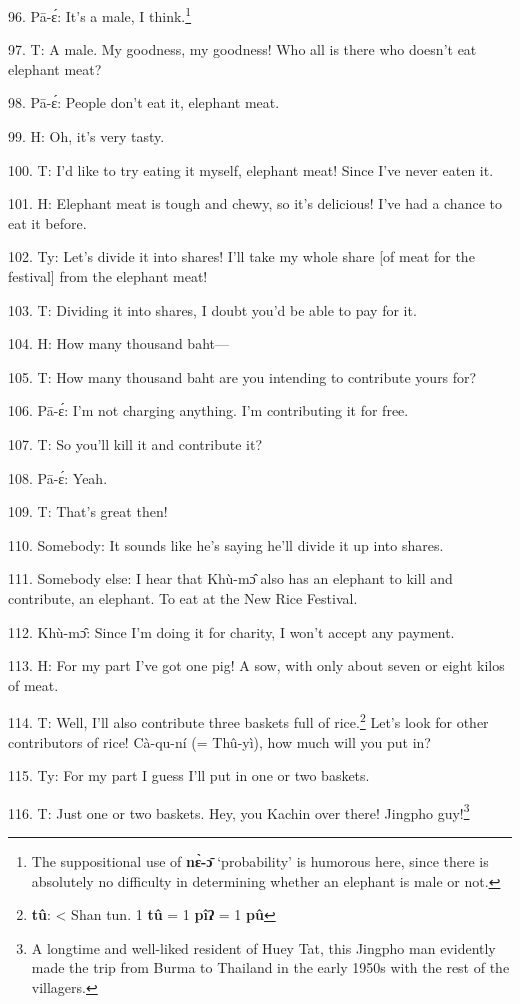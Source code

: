 96. Pā-ɛ́: It's a male, I think.\footnote{The suppositional use of \textbf{nɛ̀-ɔ̄} `probability' is humorous here, since there is absolutely no difficulty in determining whether an elephant is male or not.}

97. T: A male. My goodness, my goodness! Who all is there who doesn't eat elephant
meat?

98. Pā-ɛ́: People don't eat it, elephant meat.

99. H: Oh, it's very tasty.

100. T: I'd like to try eating it myself, elephant meat! Since I've never eaten
it.

101. H: Elephant meat is tough and chewy, so it's delicious! I've had a chance
to eat it before.

102. Ty: Let's divide it into shares! I'll take my whole share [of meat
for the festival] from the elephant meat!

103. T: Dividing it into shares, I doubt you'd be able to pay for it.

104. H: How many thousand baht---

105. T: How many thousand baht are you intending to contribute yours for?

106. Pā-ɛ́: I'm not charging anything. I'm contributing it for free.

107. T: So you'll kill it and contribute it?

108. Pā-ɛ́: Yeah.

109. T: That's great then!

110. Somebody: It sounds like he's saying he'll divide it up into shares.

111. Somebody else: I hear that Khù-mɔ̂ also has an elephant to kill and contribute,
an elephant. To eat at the New Rice Festival.

112. Khù-mɔ̂: Since I'm doing it for charity, I won't accept any payment.

113. H: For my part I've got one pig! A sow, with only about seven or eight kilos
of meat.

114. T: Well, I'll also contribute three baskets full of rice.\footnote{\textbf{tû}: < Shan tun. 1 \textbf{tû} = 1 \textbf{pîʔ} = 1 \textbf{pû}} Let's look
for other contributors of rice! Cà-qu-ní (= Thû-yì), how much will you put
in?

115. Ty: For my part I guess I'll put in one or two baskets.

116. T: Just one or two baskets. Hey, you Kachin over there! Jingpho guy!\footnote{A longtime and well-liked resident of Huey Tat, this Jingpho man evidently made the trip from Burma to Thailand in the early 1950s with the rest of the villagers.}

